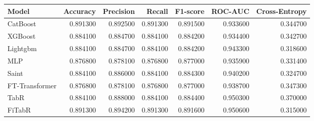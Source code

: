 \begin{tabular}{lrrrrrr}
\toprule
Model & Accuracy & Precision & Recall & F1-score & ROC-AUC & Cross-Entropy \\
\midrule
CatBoost & 0.891300 & 0.892500 & 0.891300 & 0.891500 & 0.933600 & 0.344700 \\
XGBoost & 0.884100 & 0.884700 & 0.884100 & 0.884200 & 0.934400 & 0.342700 \\
Lightgbm & 0.884100 & 0.884700 & 0.884100 & 0.884200 & 0.943300 & 0.318600 \\
MLP & 0.876800 & 0.878100 & 0.876800 & 0.877000 & 0.935900 & 0.331400 \\
Saint & 0.884100 & 0.886000 & 0.884100 & 0.884300 & 0.940200 & 0.324700 \\
FT-Transformer & 0.876800 & 0.878100 & 0.876800 & 0.877000 & 0.938700 & 0.347300 \\
TabR & 0.884100 & 0.888000 & 0.884100 & 0.884400 & 0.950300 & 0.370000 \\
FiTabR & 0.891300 & 0.894200 & 0.891300 & 0.891600 & 0.950600 & 0.315000 \\
\bottomrule
\end{tabular}
